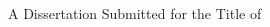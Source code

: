 \begin{titlepage}
    \begin{addmargin}[-1cm]{-3cm}
    \begin{center}
        \large

        \hfill

        \vfill

        \begingroup
            \color{CTtitle}\spacedallcaps{\myTitle} \\ \bigskip
        \endgroup

        \spacedlowsmallcaps{\myName}


        \medskip
        A Dissertation Submitted for the Title of\\
        \myDegree \\
        \medskip
        \myDepartment \\
        \myFaculty \\
        \myUni \\ \bigskip

        \myTime%

        \vfill

    \end{center}
  \end{addmargin}
\end{titlepage}
